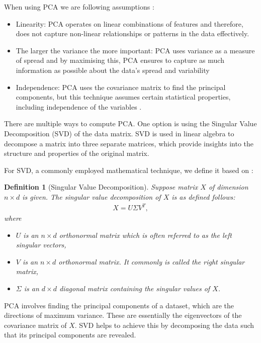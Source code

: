 \documentclass[pdftex,12pt,a4paper]{report}
\newtheorem{definition}{Definition}[section]
\begin{document}
When using PCA we are following assumptions \cite{PCA-tutorial}:
\begin{itemize}
    \item Linearity: PCA operates on linear combinations of features and therefore, does not capture non-linear relationships or patterns in the data effectively.
    \item The larger the variance the more important: PCA uses variance as a measure of spread and by maximising this, PCA ensures to capture as much information as possible about the data's spread and variability
    \item Independence: PCA uses the covariance matrix to find the principal components, but this technique assumes certain statistical properties, including independence of the variables \cite{PCA-joliffe}.
\end{itemize}

There are multiple ways to compute PCA.
One option is using the Singular Value Decomposition (SVD) of the data matrix.
SVD is used in linear algebra to decompose a matrix into three separate matrices, which provide insights into the structure and properties of the original matrix.

For SVD, a commonly employed mathematical technique, we define it based on \cite{PCA-joliffe}:
\begin{definition}[Singular Value Decomposition]\label{SVD}
    Suppose matrix $X$ of dimension $ n \times d$ is given.
    The singular value decomposition of $X$ is as defined follows:
    \begin{align*}
        X = U \Sigma V^T,
    \end{align*}
    where
    \begin{itemize}
        \item $U$ is an $n \times d$ orthonormal matrix which is often referred to as the left singular vectors,
        \item $V$ is an $n \times d$ orthonormal matrix. It commonly is called the right singular matrix,
        \item $\Sigma$ is an $d \times d$ diagonal matrix containing the singular values of $X$. 
    \end{itemize}
\end{definition}
PCA involves finding the principal components of a dataset, which are the directions of maximum variance.
These are essentially the eigenvectors of the covariance matrix of $X$.
SVD helps to achieve this by decomposing the data such that its principal components are revealed.
\end{document}
